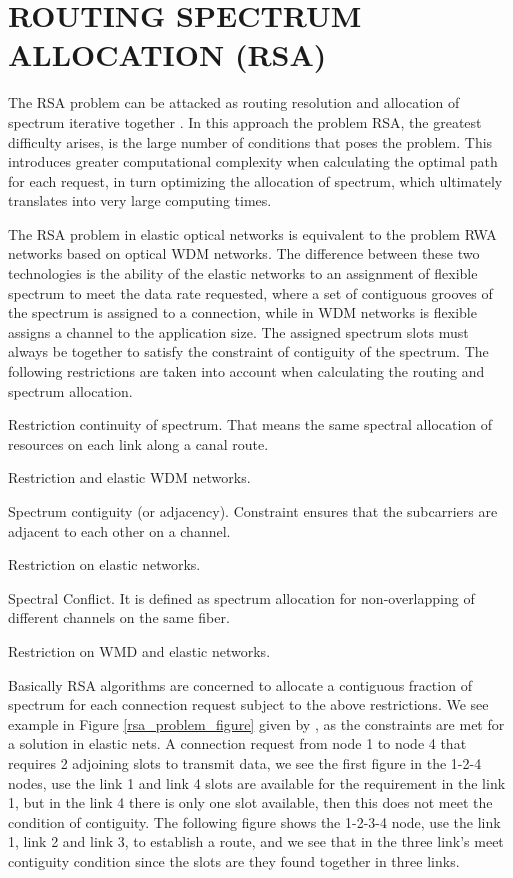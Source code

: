 \section{ROUTING SPECTRUM ALLOCATION (RSA)}

The RSA problem can be attacked as routing resolution and allocation
of spectrum iterative together \cite{Christodoulopoulos2011}. In
this approach the problem RSA, the greatest difficulty arises, is
the large number of conditions that poses the problem. This introduces
greater computational complexity when calculating the optimal path
for each request, in turn optimizing the allocation of spectrum, which
ultimately translates into very large computing times.

The RSA problem in elastic optical networks is equivalent to the problem
RWA networks based on optical WDM networks. The difference between
these two technologies is the ability of the elastic networks to an
assignment of flexible spectrum to meet the data rate requested, where
a set of contiguous grooves of the spectrum is assigned to a connection,
while in WDM networks is flexible assigns a channel to the application
size. The assigned spectrum slots must always be together to satisfy
the constraint of contiguity of the spectrum. The following restrictions
are taken into account when calculating the routing and spectrum allocation.

\textbullet{} Restriction continuity of spectrum. That means the same
spectral allocation of resources on each link along a canal route. 

Restriction and elastic WDM networks. 

\textbullet{} Spectrum contiguity (or adjacency). Constraint ensures
that the subcarriers are adjacent to each other on a channel. 

Restriction on elastic networks. 

\textbullet{} Spectral Conflict. It is defined as spectrum allocation
for non-overlapping of different channels on the same fiber. 

Restriction on WMD and elastic networks. 

Basically RSA algorithms are concerned to allocate a contiguous fraction
of spectrum for each connection request subject to the above restrictions.
We see example in Figure \ref{rsa_problem_figure} given by \cite{Chatterjee2015},
as the constraints are met for a solution in elastic nets. A connection
request from node 1 to node 4 that requires 2 adjoining slots to transmit
data, we see the first figure in the 1-2-4 nodes, use the link 1 and
link 4 slots are available for the requirement in the link 1, but
in the link 4 there is only one slot available, then this does not
meet the condition of contiguity. The following figure shows the 1-2-3-4
node, use the link 1, link 2 and link 3, to establish a route, and
we see that in the three link's meet contiguity condition since the
slots are they found together in three links. 

